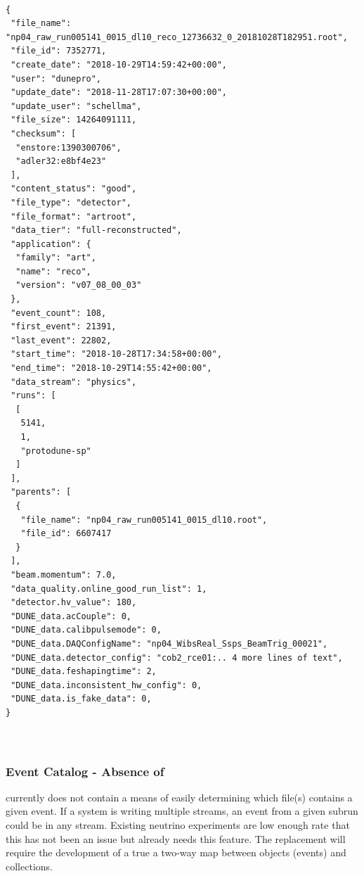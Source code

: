 \documentclass[../main-v1.tex]{subfiles}
\begin{document}
\begin{verbatim}

{
 "file_name": "np04_raw_run005141_0015_dl10_reco_12736632_0_20181028T182951.root", 
 "file_id": 7352771, 
 "create_date": "2018-10-29T14:59:42+00:00", 
 "user": "dunepro", 
 "update_date": "2018-11-28T17:07:30+00:00", 
 "update_user": "schellma", 
 "file_size": 14264091111, 
 "checksum": [
  "enstore:1390300706", 
  "adler32:e8bf4e23"
 ], 
 "content_status": "good", 
 "file_type": "detector", 
 "file_format": "artroot", 
 "data_tier": "full-reconstructed", 
 "application": {
  "family": "art", 
  "name": "reco", 
  "version": "v07_08_00_03"
 }, 
 "event_count": 108, 
 "first_event": 21391, 
 "last_event": 22802, 
 "start_time": "2018-10-28T17:34:58+00:00", 
 "end_time": "2018-10-29T14:55:42+00:00", 
 "data_stream": "physics", 
 "runs": [
  [
   5141, 
   1, 
   "protodune-sp"
  ]
 ], 
 "parents": [
  {
   "file_name": "np04_raw_run005141_0015_dl10.root", 
   "file_id": 6607417
  }
 ],
 "beam.momentum": 7.0, 
 "data_quality.online_good_run_list": 1, 
 "detector.hv_value": 180, 
 "DUNE_data.acCouple": 0, 
 "DUNE_data.calibpulsemode": 0, 
 "DUNE_data.DAQConfigName": "np04_WibsReal_Ssps_BeamTrig_00021", 
 "DUNE_data.detector_config": "cob2_rce01:.. 4 more lines of text", 
 "DUNE_data.feshapingtime": 2, 
 "DUNE_data.inconsistent_hw_config": 0, 
 "DUNE_data.is_fake_data": 0, 
}



\end{verbatim}



\subsubsection{Event Catalog - Absence of}
 currently does not contain a means of easily determining which file(s) contains a given event.  If a  system is writing multiple streams, an event from a given subrun could be in any stream.   Existing neutrino experiments are low enough rate that this has not been an issue but  already needs this feature.
The  replacement will require the development of a true a two-way map between objects (events) and collections. 
 
\end{document}
